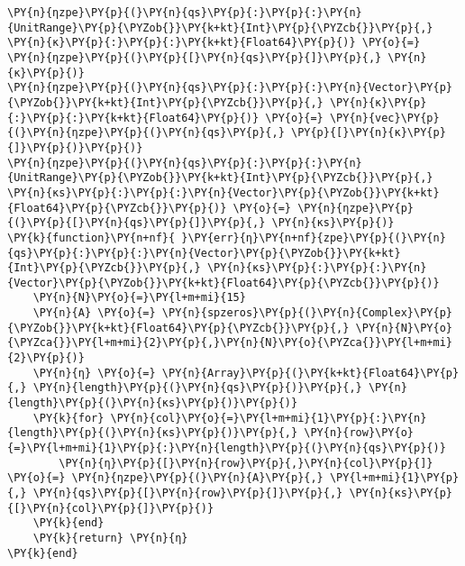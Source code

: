 \begin{Verbatim}[commandchars=\\\{\}]
\PY{n}{ηzpe}\PY{p}{(}\PY{n}{qs}\PY{p}{:}\PY{p}{:}\PY{n}{UnitRange}\PY{p}{\PYZob{}}\PY{k+kt}{Int}\PY{p}{\PYZcb{}}\PY{p}{,} \PY{n}{κ}\PY{p}{:}\PY{p}{:}\PY{k+kt}{Float64}\PY{p}{)} \PY{o}{=} \PY{n}{ηzpe}\PY{p}{(}\PY{p}{[}\PY{n}{qs}\PY{p}{]}\PY{p}{,} \PY{n}{κ}\PY{p}{)}
\PY{n}{ηzpe}\PY{p}{(}\PY{n}{qs}\PY{p}{:}\PY{p}{:}\PY{n}{Vector}\PY{p}{\PYZob{}}\PY{k+kt}{Int}\PY{p}{\PYZcb{}}\PY{p}{,} \PY{n}{κ}\PY{p}{:}\PY{p}{:}\PY{k+kt}{Float64}\PY{p}{)} \PY{o}{=} \PY{n}{vec}\PY{p}{(}\PY{n}{ηzpe}\PY{p}{(}\PY{n}{qs}\PY{p}{,} \PY{p}{[}\PY{n}{κ}\PY{p}{]}\PY{p}{)}\PY{p}{)}
\PY{n}{ηzpe}\PY{p}{(}\PY{n}{qs}\PY{p}{:}\PY{p}{:}\PY{n}{UnitRange}\PY{p}{\PYZob{}}\PY{k+kt}{Int}\PY{p}{\PYZcb{}}\PY{p}{,} \PY{n}{κs}\PY{p}{:}\PY{p}{:}\PY{n}{Vector}\PY{p}{\PYZob{}}\PY{k+kt}{Float64}\PY{p}{\PYZcb{}}\PY{p}{)} \PY{o}{=} \PY{n}{ηzpe}\PY{p}{(}\PY{p}{[}\PY{n}{qs}\PY{p}{]}\PY{p}{,} \PY{n}{κs}\PY{p}{)}
\PY{k}{function}\PY{n+nf}{ }\PY{err}{η}\PY{n+nf}{zpe}\PY{p}{(}\PY{n}{qs}\PY{p}{:}\PY{p}{:}\PY{n}{Vector}\PY{p}{\PYZob{}}\PY{k+kt}{Int}\PY{p}{\PYZcb{}}\PY{p}{,} \PY{n}{κs}\PY{p}{:}\PY{p}{:}\PY{n}{Vector}\PY{p}{\PYZob{}}\PY{k+kt}{Float64}\PY{p}{\PYZcb{}}\PY{p}{)}
    \PY{n}{N}\PY{o}{=}\PY{l+m+mi}{15}
    \PY{n}{A} \PY{o}{=} \PY{n}{spzeros}\PY{p}{(}\PY{n}{Complex}\PY{p}{\PYZob{}}\PY{k+kt}{Float64}\PY{p}{\PYZcb{}}\PY{p}{,} \PY{n}{N}\PY{o}{\PYZca{}}\PY{l+m+mi}{2}\PY{p}{,}\PY{n}{N}\PY{o}{\PYZca{}}\PY{l+m+mi}{2}\PY{p}{)}
    \PY{n}{η} \PY{o}{=} \PY{n}{Array}\PY{p}{(}\PY{k+kt}{Float64}\PY{p}{,} \PY{n}{length}\PY{p}{(}\PY{n}{qs}\PY{p}{)}\PY{p}{,} \PY{n}{length}\PY{p}{(}\PY{n}{κs}\PY{p}{)}\PY{p}{)}
    \PY{k}{for} \PY{n}{col}\PY{o}{=}\PY{l+m+mi}{1}\PY{p}{:}\PY{n}{length}\PY{p}{(}\PY{n}{κs}\PY{p}{)}\PY{p}{,} \PY{n}{row}\PY{o}{=}\PY{l+m+mi}{1}\PY{p}{:}\PY{n}{length}\PY{p}{(}\PY{n}{qs}\PY{p}{)}
        \PY{n}{η}\PY{p}{[}\PY{n}{row}\PY{p}{,}\PY{n}{col}\PY{p}{]} \PY{o}{=} \PY{n}{ηzpe}\PY{p}{(}\PY{n}{A}\PY{p}{,} \PY{l+m+mi}{1}\PY{p}{,} \PY{n}{qs}\PY{p}{[}\PY{n}{row}\PY{p}{]}\PY{p}{,} \PY{n}{κs}\PY{p}{[}\PY{n}{col}\PY{p}{]}\PY{p}{)}
    \PY{k}{end}
    \PY{k}{return} \PY{n}{η}
\PY{k}{end}


\end{Verbatim}
